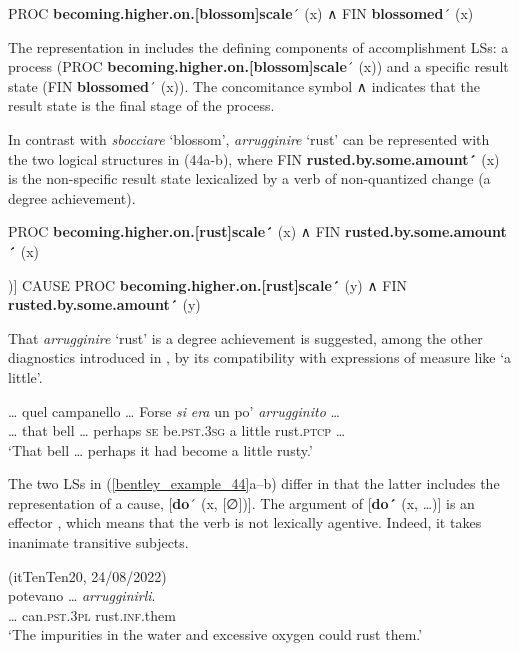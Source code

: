 \documentclass[output=paper,colorlinks,citecolor=brown
]{langscibook}
\begin{document}
\ea \label{bentley_example_43}
    PROC \textbf{becoming.higher.on.[blossom]scale}´ (x) ∧ FIN \textbf{blossomed}´ (x)
\z

The representation in  includes the defining components of accomplishment LSs: a process (PROC \textbf{becoming.higher.on.[blossom]scale}´ (x)) and a specific result state (FIN\textbf{ blossomed}´ (x)). The concomitance symbol ∧ indicates that the result state is the final stage of the process. 

In contrast with \textit{sbocciare} ‘blossom’, \textit{arrugginire} ‘rust’ can be represented with the two logical structures in (44a-b), where FIN \textbf{rusted.by.some.amount´} (x) is the non-specific result state lexicalized by a verb of non-quantized change (a degree achievement). 

\ea \label{bentley_example_44}
\ea \label{bentley_example_44a}
    PROC \textbf{becoming.higher.on.[}\textbf{rust]scale}\textbf{´} (x) ∧ FIN \textbf{rusted.by.some.amount}\textbf{´} (x)

\ex \label{bentley_example_44b}
    \relax
    [\textbf{do´} (x, [∅])] CAUSE PROC \textbf{becoming.higher.on.[rust]scale´} (y) ∧ FIN \textbf{rusted.by.some.amount´} (y)     
\z
\z

That \textit{arrugginire} ‘rust’ is a degree achievement is suggested, among the other diagnostics introduced in , by its compatibility with expressions of measure like ‘a little’. 


\ea \label{bentley_example_45}
    \gll
     {\ldots}  quel		campanello  {\ldots} 		Forse			\textit{si} 		\textit{era} 							un	po’ 		\textit{arrugginito}  {\ldots}  \\
    {\ldots} that		bell {\ldots}	perhaps	\textsc{se}		be.\textsc{pst}.3\textsc{sg}	a			little		rust.\textsc{ptcp} {\ldots} \\
    \glt
    ‘That bell  \ldots{}  perhaps it had become a little rusty.’
\z

The two LSs in (\ref{bentley_example_44}a–b) differ in that the latter includes the representation of a cause, [\textbf{do}´ (x, [∅])]. The argument of [\textbf{do´} (x,  \ldots)] is an effector \citep{vanvalin1996case}, which means that the verb is not lexically agentive. Indeed, it takes inanimate transitive subjects. 

\ea \label{bentley_example_46}(itTenTen20, 24/08/2022)\\
     potevano  {\ldots} \textit{arrugginirli}.\\
    {\ldots} can.\textsc{pst}.3\textsc{pl} {} rust.\textsc{inf}.them\\
    \glt
    ‘The impurities in the water and excessive oxygen could rust them.’
\z
\end{document}

